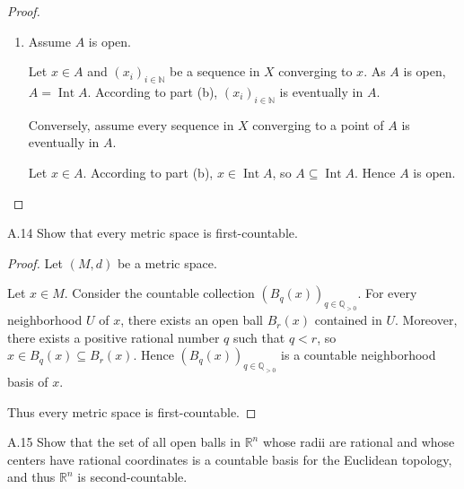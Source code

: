 \begin{proof}
\begin{enumerate}[itemsep=0pt,label={(\alph*)}]
              Conversely, assume \( A \) contains every limit of every convergent sequence of points in \( A \).

              Let \( x \in \overline{A} \) then according to part (a), there is a sequence \( {(x_{i})}_{i\in\mathbb{N}} \) of points in \( A \) converging to \( x \). So \( x \in A \), hence \( \overline{A} \subseteq A \), which means \( A \) is closed.
        \item Assume \( A \) is open.

              Let \( x \in A \) and \( {(x_{i})}_{i\in\mathbb{N}} \) be a sequence in \( X \) converging to \( x \). As \( A \) is open, \( A = \operatorname{Int} A \). According to part (b), \( {(x_{i})}_{i\in\mathbb{N}} \) is eventually in \( A \).

              Conversely, assume every sequence in \( X \) converging to a point of \( A \) is eventually in \( A \).

              Let \( x \in A \). According to part (b), \( x \in \operatorname{Int} A \), so \( A \subseteq \operatorname{Int} A \). Hence \( A \) is open.
    \end{enumerate}
\end{proof}

\begin{exercise}{A.14}
    Show that every metric space is first-countable.
\end{exercise}

\begin{proof}
    Let \( (M, d) \) be a metric space.

    Let \( x \in M \). Consider the countable collection \( {(B_{q}(x))}_{q\in \mathbb{Q}_{> 0}} \). For every neighborhood \( U \) of \( x \), there exists an open ball \( B_{r}(x) \) contained in \( U \). Moreover, there exists a positive rational number \( q \) such that \( q < r \), so \( x \in B_{q}(x) \subseteq B_{r}(x) \). Hence \( {(B_{q}(x))}_{q\in \mathbb{Q}_{> 0}} \) is a countable neighborhood basis of \( x \).

    Thus every metric space is first-countable.
\end{proof}

\begin{exercise}{A.15}
    Show that the set of all open balls in \( \mathbb{R}^{n} \) whose radii are rational and whose centers have rational coordinates is a countable basis for the Euclidean topology, and thus \( \mathbb{R}^{n} \) is second-countable.
\end{exercise}

